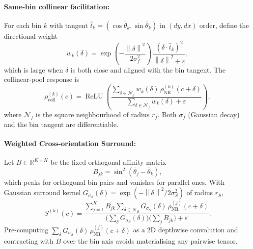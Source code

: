 \documentclass[11pt,a4paper]{article}
\newcommand{\R}{\mathbb{R}}
\newcommand{\norm}[1]{\left\lVert#1\right\rVert}
\newcommand{\relu}{\operatorname{ReLU}}
\begin{document}
\paragraph{Same-bin collinear facilitation:}
For each bin $k$ with tangent $\hat t_k = (\cos\bar\theta_k, \sin\bar\theta_k)$ in $(dy, dx)$ order, define the directional weight
\begin{equation}\label{eq:pos-t}
  w_k(\delta) = \exp\!\left(-\frac{\norm{\delta}^2}{2\sigma_f^2}\right) \,
                \frac{(\delta \cdot \hat t_k)^2}{\norm{\delta}^2 + \varepsilon},
\end{equation}
which is large when $\delta$ is both close and aligned with the bin tangent. The collinear-pool response is
\begin{equation}\label{eq:rho-coll}
  \rho_{\mathrm{coll}}^{(k)}(c) = \relu\!\left(
  \frac{\sum_{\delta \in \mathcal{N}_f} w_k(\delta)\, \rho_{\mathrm{NR}}^{(k)}(c + \delta)}
       {\sum_{\delta \in \mathcal{N}_f} w_k(\delta) + \varepsilon}
  \right),
\end{equation}
where $\mathcal{N}_f$ is the square neighbourhood of radius $r_f$. Both $\sigma_f$ (Gaussian decay) and the bin tangent are differentiable.

\paragraph{Weighted Cross-orientation Surround:}
Let $B \in \R^{K \times K}$ be the fixed orthogonal-affinity matrix
\begin{equation}\label{eq:B}
  B_{jk} = \sin^2(\bar\theta_j - \bar\theta_k),
\end{equation}
which peaks for orthogonal bin pairs and vanishes for parallel ones. With Gaussian surround kernel $G_{\sigma_S}(\delta) = \exp(-\norm{\delta}^2 / 2\sigma_S^2)$ of radius $r_S$,
\begin{equation}\label{eq:S}
  S^{(k)}(c) = \frac{\sum_{j=1}^{K} B_{jk} \sum_{\delta \in \mathcal{N}_S} G_{\sigma_S}(\delta)\, \rho_{\mathrm{NR}}^{(j)}(c + \delta)}
                       {\bigl(\sum_{\delta} G_{\sigma_S}(\delta)\bigr) \bigl(\sum_{j} B_{jk}\bigr) + \varepsilon}.
\end{equation}
Pre-computing $\sum_{\delta} G_{\sigma_S}(\delta)\, \rho_{\mathrm{NR}}^{(j)}(c+\delta)$ as a 2D depthwise convolution and contracting with $B$ over the bin axis avoids materialising any pairwise tensor.
\end{document}
